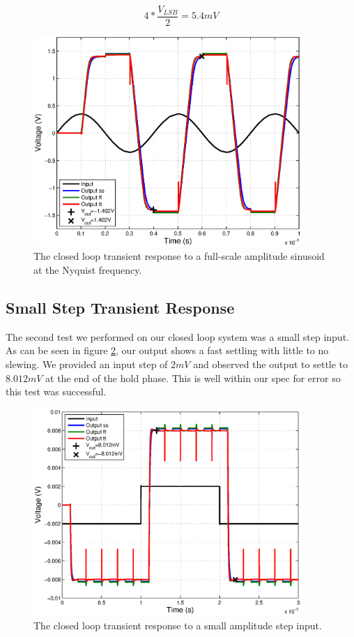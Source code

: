 \documentclass[journal]{IEEEtran}
\begin{document}
\begin{equation}
4*\frac{V_{LSB}}{2} = 5.4mV
\end{equation}

\begin{figure}
\centering
\includegraphics[width=4in]{Plots/closed_sine.eps}
\caption{The closed loop transient response to a full-scale amplitude sinusoid at the Nyquist frequency.}
\label{fig:closed_sine}
\end{figure}


\subsection{Small Step Transient Response}
The second test we performed on our closed loop system was a small step input. As can be seen in figure \ref{fig:closed_small_step}, our output shows a fast settling with little to no slewing. We provided an input step of $2mV$ and observed the output to settle to $8.012mV$ at the end of the hold phase. This is well within our spec for error so this test was successful.

\begin{figure}
\centering
\includegraphics[width=4in]{Plots/closed_small_step.eps}
\caption{The closed loop transient response to a small amplitude step input.}
\label{fig:closed_small_step}
\end{figure}
\end{document}
